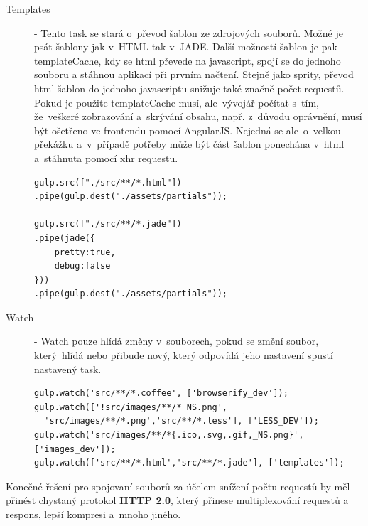 \documentclass[a4paper,12pt,twoside,BCOR=10mm]{article}
\renewcommand{\b}[1]{\textbf{#1}} %
\newenvironment{codeframe}{%
  \begin{Sbox} 
    \begin{minipage} 
      {\columnwidth-\leftmargin-\rightmargin-2\fboxsep-2\fboxrule-4pt} 
}{%

  \end{minipage} 
  \end{Sbox} 
  \begin{center} 
    \fcolorbox{black}{codeback}{\TheSbox} 
  \end{center} 
}
\begin{document}
\begin{description}
\item[Templates] - Tento task se stará o~převod šablon ze zdrojových souborů. Možné je psát šablony jak v~HTML tak v~JADE. Další možností šablon je pak templateCache, kdy se html převede na javascript, spojí se do jednoho souboru a stáhnou aplikací při prvním načtení. Stejně jako sprity, převod html šablon do jednoho javascriptu snižuje také značně počet requestů. Pokud je použite templateCache musí, ale~vývojář počítat s~tím, že~veškeré zobrazování a~skrývání obsahu, např. z~důvodu oprávnění, musí být ošetřeno ve frontendu pomocí AngularJS. Nejedná se ale~o~velkou překážku a~v~případě potřeby může být část šablon ponechána v~html a~stáhnuta pomocí xhr requestu.
\begin{codeframe}
  \begin{verbatim}
gulp.src(["./src/**/*.html"])
.pipe(gulp.dest("./assets/partials"));

gulp.src(["./src/**/*.jade"])
.pipe(jade({
    pretty:true,
    debug:false
}))
.pipe(gulp.dest("./assets/partials"));
  \end{verbatim}
\end{codeframe}

\item[Watch] - Watch pouze hlídá změny v~souborech, pokud se změní soubor, který~hlídá nebo přibude nový, který odpovídá jeho nastavení spustí nastavený task.
\begin{codeframe}
  \begin{verbatim}
gulp.watch('src/**/*.coffee', ['browserify_dev']);
gulp.watch(['!src/images/**/*_NS.png',
  'src/images/**/*.png','src/**/*.less'], ['LESS_DEV']);
gulp.watch('src/images/**/*{.ico,.svg,.gif,_NS.png}', ['images_dev']);
gulp.watch(['src/**/*.html','src/**/*.jade'], ['templates']);
  \end{verbatim}
\end{codeframe}
\end{description}

Konečné řešení pro spojovaní souborů za účelem snížení počtu requestů by měl přinést chystaný protokol \b{HTTP 2.0}, který přinese multiplexování requestů a respons, lepší kompresi a~mnoho jiného.\cite{http2}
\end{document}
